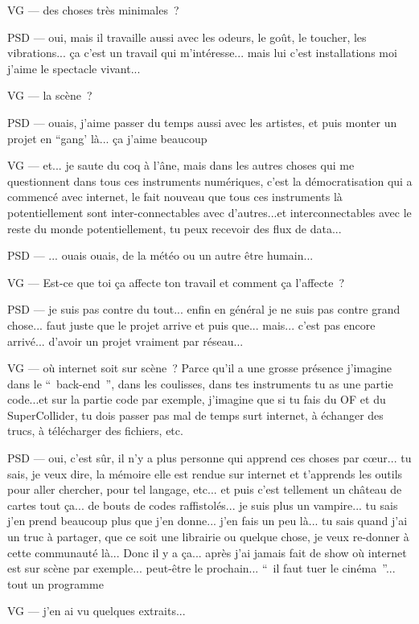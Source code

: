 VG — des choses très minimales ?

PSD — oui, mais il travaille aussi avec les odeurs, le goût, le toucher, les vibrations... ça c'est un travail qui m'intéresse... mais lui c'est installations moi j'aime le spectacle vivant...

VG — la scène ?

PSD — ouais, j'aime passer du temps aussi avec les artistes, et puis monter un projet en “gang' là... ça j'aime beaucoup

VG — et... je saute du coq à l'âne, mais dans les autres choses qui me questionnent dans tous ces instruments numériques, c'est la démocratisation qui a commencé avec internet, le fait nouveau que tous ces instruments là potentiellement sont inter-connectables avec d'autres...et interconnectables avec le reste du monde potentiellement, tu peux recevoir des flux de data...

PSD — ... ouais ouais, de la météo ou un autre être humain...

VG — Est-ce que toi ça affecte ton travail et comment ça l'affecte ?

PSD — je suis pas contre du tout... enfin en général je ne suis pas contre grand chose... faut juste que le projet arrive et puis que... mais... c'est pas encore arrivé... d'avoir un projet vraiment par réseau...

VG — où internet soit sur scène ? Parce qu'il a une grosse présence j'imagine dans le “ back-end ”, dans les coulisses, dans tes instruments tu as une partie code...et sur la partie code par exemple, j'imagine que si tu fais du OF et du SuperCollider, tu dois passer pas mal de temps surt internet, à échanger des trucs, à  télécharger des fichiers, etc.

PSD — oui, c'est sûr, il n'y a plus personne qui apprend ces choses par cœur... tu sais, je veux dire,  la mémoire elle est rendue sur internet et t'apprends les outils pour aller chercher, pour tel langage, etc... et puis c'est tellement un château de cartes tout ça... de bouts de codes raffistolés... je suis plus un vampire... tu sais j'en prend beaucoup plus que j'en donne... j'en fais un peu là... tu sais quand j'ai un truc à partager, que ce soit une librairie ou quelque chose, je veux re-donner à cette communauté là... Donc il y a ça... après j'ai jamais fait de show où internet est sur scène par exemple... peut-être le prochain... “ il faut tuer le cinéma ”... tout un programme 

VG — j'en ai vu quelques extraits...

